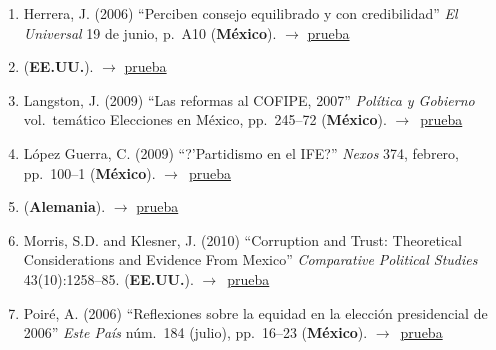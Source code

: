 \documentclass[12 pt, letter]{article}
\newenvironment{CitasMiTrabajo}{
    \begin{footnotesize}
    \begin{enumerate}[label={\footnotesize\emph{cita~\arabic*}},ref=\arabic*] %
        \setlength{\itemsep}{.1\itemsep}
        \setlength{\parskip}{.1\parskip}
    }{\end{enumerate}\end{footnotesize}}
\begin{document}
\begin{CitasMiTrabajo}
        \item Herrera, J. (2006)
        ``Perciben consejo equilibrado y con
        credibilidad'' \emph{El Universal} 19 de junio, p.\ A10  (\textbf{M\'exico}). $\rightarrow$ \href{https://github.com/emagar/cv/blob/master/citasMiTrab/estevezEtalElecStud/univ.pdf}{prueba}

        \item {} (\textbf{EE.UU.}).  $\rightarrow$ \href{https://github.com/emagar/cv/blob/master/citasMiTrab/estevezEtalElecStud/hyde2015.pdf}{prueba}

        \item Langston, J. (2009) ``Las reformas al COFIPE, 2007''
            \emph{Pol\'itica y Gobierno}
            vol.\ tem\'atico Elecciones en M\'exico, pp.\ 245--72 (\textbf{M\'exico}). $\rightarrow$~\href{https://github.com/emagar/cv/blob/master/citasMiTrab/estevezEtalElecStud/langstonRefCofipe2009pyg.excerpt.pdf}{prueba}
            
        \item L\'opez Guerra, C. (2009)
        ``?'Partidismo en el IFE?''
        \emph{Nexos} 374, febrero, pp.\ 100--1 (\textbf{M\'exico}). $\rightarrow$~\href{https://github.com/emagar/cv/blob/master/citasMiTrab/estevezEtalElecStud/lg.pdf}{prueba}

        \item {} (\textbf{Alemania}).  $\rightarrow$ \href{https://github.com/emagar/cv/blob/master/citasMiTrab/estevezEtalElecStud/martin2015.pdf}{prueba}

        \item Morris, S.D. and Klesner, J. (2010)
            ``Corruption and Trust: Theoretical Considerations and Evidence From Mexico''
            \emph{Comparative Political Studies} 43(10):1258--85. (\textbf{EE.UU.}). $\rightarrow$~\href{https://github.com/emagar/cv/blob/master/citasMiTrab/estevezEtalElecStud/morris.klesnerCorruptionTrustMx2010cps.pdf}{prueba}

        \item Poir\'e, A. (2006)
        ``Reflexiones sobre la equidad en la
        elecci\'on presidencial de 2006'' \emph{Este Pa\'is} n\'um.\ 184
        (julio), pp.\ 16--23  (\textbf{M\'exico}). $\rightarrow$~\href{https://github.com/emagar/cv/blob/master/citasMiTrab/estevezEtalElecStud/poire.pdf}{prueba}


\end{CitasMiTrabajo}
\end{document}
